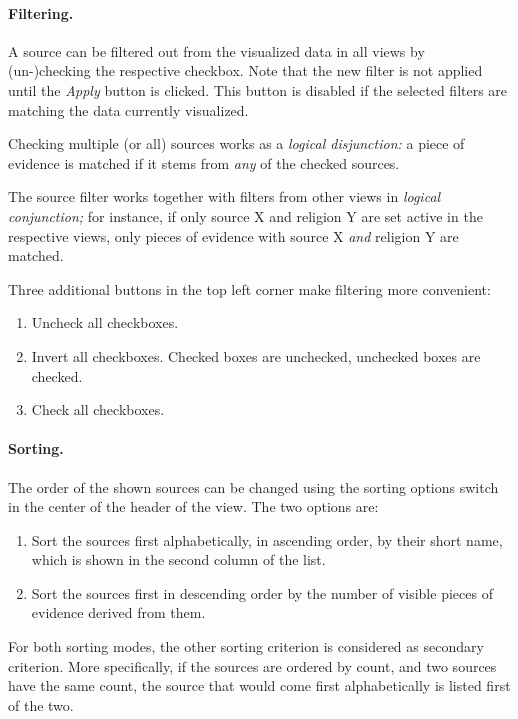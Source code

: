 \paragraph{Filtering.}
A source can be filtered out from the visualized data in all views by (un-)checking the respective checkbox.
Note that the new filter is not applied until the \emph{Apply} button is clicked.
This button is disabled if the selected filters are matching the data currently visualized.

Checking multiple (or all) sources works as a \emph{logical disjunction:}
a piece of evidence is matched if it stems from \emph{any} of the checked sources.

The source filter works together with filters from other views in \emph{logical conjunction;}
for instance, if only source X and religion Y are set active in the respective views, only pieces of evidence with source X \emph{and} religion Y are matched.

Three additional buttons in the top left corner make filtering more convenient:

\begin{enumerate}
  \item Uncheck all checkboxes.
  \item
    Invert all checkboxes.
    Checked boxes are unchecked, unchecked boxes are checked.
  \item Check all checkboxes.
\end{enumerate}

\paragraph{Sorting.}
The order of the shown sources can be changed using the sorting options switch in the center of the header of the view.
The two options are:

\begin{enumerate}
  \item Sort the sources first alphabetically, in ascending order, by their short name, which is shown in the second column of the list.
  \item Sort the sources first in descending order by the number of visible pieces of evidence derived from them.
\end{enumerate}

For both sorting modes, the other sorting criterion is considered as secondary criterion.
More specifically, if the sources are ordered by count, and two sources have the same count, the source that would come first alphabetically is listed first of the two.


